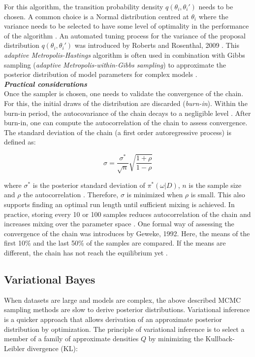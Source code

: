 For this algorithm, the transition probability density $q(\theta_i,\theta_i')$ needs to be chosen. A common choice is a Normal distribution centred at $\theta_i$ where the variance needs to be selected to have some level of optimality in the performance of the algorithm \citep{Roberts2001}. An automated tuning process for the variance of the proposal distribution $q(\theta_i,\theta_i')$ was introduced by Roberts and Rosenthal, 2009 \citep{Roberts2009}. This \emph{adaptive Metropolis-Hastings} algorithm is often used in combination with Gibbs sampling (\emph{adaptive Metropolis-within-Gibbs sampling}) to approximate the posterior distribution of model parameters for complex models \citep{Roberts2009}.\\

\textbf{\textit{Practical considerations}}\\

Once the sampler is chosen, one needs to validate the convergence of the chain. For this, the initial draws of the distribution are discarded (\emph{burn-in}). Within the burn-in period, the autocovariance of the chain decays to a negligible level \citep{Greyer1992}. After burn-in, one can compute the autocorrelation of the chain to assess convergence. The standard deviation of the chain (a first order autoregressive process) is defined as:

\begin{equation}
\sigma=\frac{\sigma^*}{\sqrt{n}}\sqrt{\frac{1+\rho}{1-\rho}}
\end{equation}

where $\sigma^*$ is the posterior standard deviation of $\pi^*(\omega|D)$, $n$ is the sample size and $\rho$ the autocorrelation \citep{Tierney1991}. Therefore, $\sigma$ is minimized when $\rho$ is small. This also supports finding an optimal run length until sufficient mixing is achieved. In practice, storing every 10 or 100 samples reduces autocorrelation of the chain and increases mixing over the parameter space \citep{Greyer1992}. One formal way of assessing the convergence of the chain was introduces by Geweke, 1992. Here, the means of the first 10\% and the last 50\% of the samples are compared. If the means are different, the chain has not reach the equilibrium yet \citep{Geweke1992}.

\subsection{Variational Bayes}

When datasets are large and models are complex, the above described MCMC sampling methods are slow to derive posterior distributions. Variational inference is a quicker approach that allows derivation of an approximate posterior distribution by optimization. The principle of variational inference is to select a member of a family of approximate densities $Q$ by minimizing the Kullback-Leibler divergence (KL):

